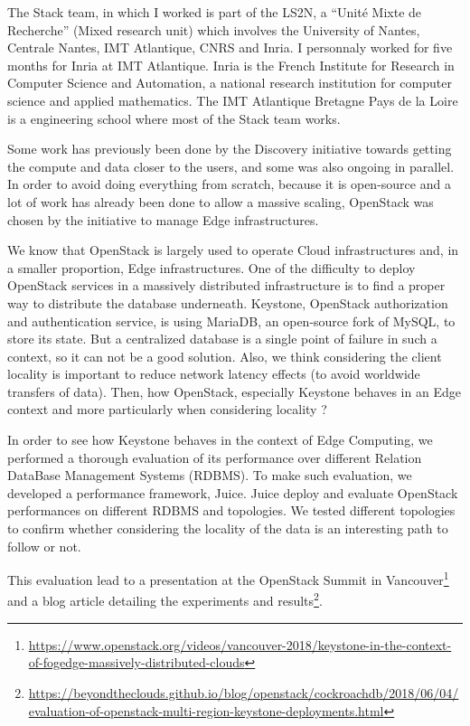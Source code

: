 The Stack team, in which I worked is part of the LS2N, a ``Unité Mixte de Recherche'' (Mixed research unit) which involves the University of Nantes, Centrale Nantes, IMT Atlantique, CNRS and Inria. I personnaly worked for five months for Inria at IMT Atlantique. Inria is the French Institute for Research in Computer Science and Automation, a national research institution for computer science and applied mathematics. The IMT Atlantique Bretagne Pays de la Loire is a engineering school where most of the Stack team works.

Some work has previously been done by the Discovery initiative towards getting the compute and data closer to the users, and some was also ongoing in parallel. In order to avoid doing everything from scratch, because it is open-source and a lot of work has already been done to allow a massive scaling, OpenStack was chosen by the initiative to manage Edge infrastructures.

We know that OpenStack is largely used to operate Cloud infrastructures and, in a smaller proportion, Edge infrastructures. One of the difficulty to deploy OpenStack services in a massively distributed infrastructure is to find a proper way to distribute the database underneath. Keystone, OpenStack authorization and authentication service, is using MariaDB, an open-source fork of MySQL, to store its state. But a centralized database is a single point of failure in such a context, so it can not be a good solution. Also, we think considering the client locality is important to reduce network latency effects (to avoid worldwide transfers of data).
Then, how OpenStack, especially Keystone behaves in an Edge context and more particularly when considering locality ?

In order to see how Keystone behaves in the context of Edge Computing, we performed a thorough evaluation of its performance over different Relation DataBase Management Systems (RDBMS). To make such evaluation, we developed a performance framework, Juice. Juice deploy and evaluate OpenStack performances on different RDBMS and topologies. We tested different topologies to confirm whether considering the locality of the data is an interesting path to follow or not.

This evaluation lead to a presentation at the OpenStack Summit in Vancouver\footnote{\url{https://www.openstack.org/videos/vancouver-2018/keystone-in-the-context-of-fogedge-massively-distributed-clouds}} and a blog article detailing the experiments and results\footnote{\url{https://beyondtheclouds.github.io/blog/openstack/cockroachdb/2018/06/04/evaluation-of-openstack-multi-region-keystone-deployments.html}}.

